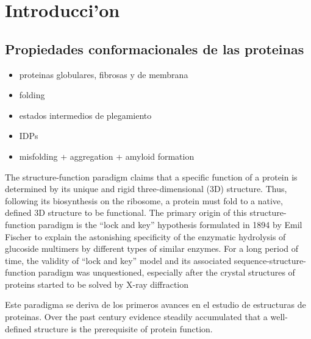 \chapter{Introducci'on}
% 



\section{Propiedades conformacionales de las proteinas}
\begin{itemize}
 \item proteinas globulares, fibrosas y de membrana
 \item folding
 \item estados intermedios de plegamiento
 \item IDPs
 \item misfolding + aggregation + amyloid formation
\end{itemize}


The structure-function paradigm claims that a specific function of a protein is determined by its unique and rigid three-dimensional (3D) structure. 
Thus, following its biosynthesis on the ribosome, a protein must fold to a native, defined 3D structure to be functional. 
The primary origin of this structure-function paradigm is the “lock and key” hypothesis formulated in 1894 by Emil Fischer to explain the astonishing specificity of the enzymatic hydrolysis of glucoside multimers by different types
of similar enzymes. For a long period of time, the validity of “lock and key” model and its associated sequence-structure-function paradigm was unquestioned, especially after the crystal structures of proteins started to be solved by X-ray diffraction

Este paradigma se deriva de los primeros avances en el estudio de estructuras de proteinas. Over the past century evidence steadily accumulated that a well-defined structure is the prerequisite of protein function.



